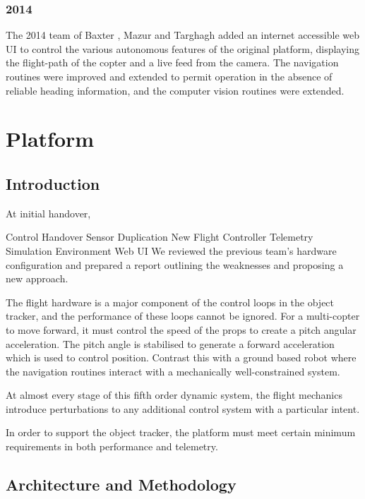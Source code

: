 \documentclass{article}
\begin{document}
      \subsubsection{2014}

        The 2014 team of Baxter \cite{Baxter}, Mazur \cite{Mazur} and Targhagh \cite{Targhagh} added an internet accessible web UI to control the various autonomous features of the original platform, displaying the flight-path of the copter and a live feed from the camera.
        The navigation routines were improved and extended to permit operation in the absence of reliable heading information, and the computer vision routines were extended.

  \section{Platform}
    \subsection{Introduction}
      At initial handover, 

Control Handover
Sensor Duplication
New Flight Controller
Telemetry
Simulation Environment
Web UI
      We reviewed the previous team's hardware configuration and prepared a report outlining the weaknesses and proposing a new approach.
    
      The flight hardware is a major component of the control loops in the object tracker, and the performance of these loops cannot be ignored.
      For a multi-copter to move forward, it must control the speed of the props to create a pitch angular acceleration. The pitch angle is stabilised to generate a forward acceleration which is used to control position.
      Contrast this with a ground based robot where the navigation routines interact with a mechanically well-constrained system.
      
      At almost every stage of this fifth order dynamic system, the flight mechanics introduce perturbations to any additional control system with a particular intent.

      In order to support the object tracker, the platform must meet certain minimum requirements in both performance and telemetry.


    \subsection{Architecture and Methodology}
\end{document}
